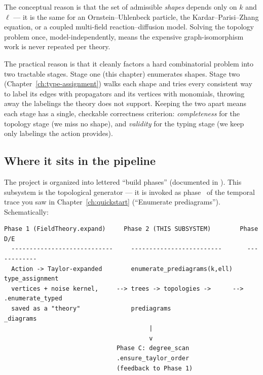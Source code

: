 The conceptual reason is that the set of admissible \emph{shapes} depends only on
$k$ and $\ell$ --- it is the same for an Ornstein--Uhlenbeck particle, the
Kardar--Parisi--Zhang equation, or a coupled multi-field reaction--diffusion
model. Solving the topology problem once, model-independently, means the
expensive graph-isomorphism work is never repeated per theory.

The practical reason is that it cleanly factors a hard combinatorial problem into
two tractable stages. Stage one (this chapter) enumerates shapes. Stage two
(Chapter~\ref{ch:type-assignment}) walks each shape and tries every consistent
way to label its edges with propagators and its vertices with monomials, throwing
away the labelings the theory does not support. Keeping the two apart means each
stage has a single, checkable correctness criterion: \emph{completeness} for the
topology stage (we miss no shape), and \emph{validity} for the typing stage (we
keep only labelings the action provides).

\subsection{Where it sits in the pipeline}

The project is organized into lettered ``build phases'' (documented in
). This subsystem is the topological
generator --- it is invoked as phase~\code{[5/7]} of the temporal trace you saw
in Chapter~\ref{ch:quickstart} (``Enumerate prediagrams''). Schematically:

\begin{lstlisting}[style=console]
  Phase 1 (FieldTheory.expand)     Phase 2 (THIS SUBSYSTEM)        Phase D/E
  ----------------------------     -------------------------       ------------
  Action -> Taylor-expanded        enumerate_prediagrams(k,ell)    type_assignment
  vertices + noise kernel,     --> trees -> topologies ->      --> .enumerate_typed
  saved as a "theory"              prediagrams                     _diagrams
                                        |
                                        v
                               Phase C: degree_scan
                               .ensure_taylor_order
                               (feedback to Phase 1)
\end{lstlisting}

